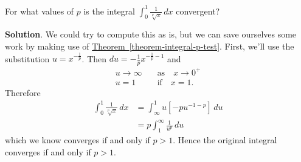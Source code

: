 \documentclass[10pt,]{book}
\theoremstyle{ptxplainnotitle}
\theoremstyle{ptxplaintitle}
\theoremstyle{ptxplainnotitle}
\theoremstyle{ptxplaintitle}
\theoremstyle{ptxplainnotitle}
\theoremstyle{ptxplaintitle}
\theoremstyle{ptxdefinitionnotitle}
\theoremstyle{ptxdefinitiontitle}
\theoremstyle{ptxdefinitionnotitle}
\theoremstyle{ptxdefinitiontitle}
\theoremstyle{ptxdefinitionnotitle}
\theoremstyle{ptxdefinitiontitle}
\theoremstyle{ptxdefinitionnotitle}
\theoremstyle{ptxdefinitiontitle}
\theoremstyle{ptxdefinitionnotitle}
\theoremstyle{ptxdefinitiontitle}
\numberwithin{equation}{section}
\newcommand{\gt}{>}
\begin{document}
\begin{example}\label{example-another-integral-p-test}
\hypertarget{p-600}{}%
For what values of \(p\) is the integral \(\int_{0}^{1}\frac{1}{\sqrt[p]{x}}\,dx\) convergent?%
\par\smallskip%
\noindent\textbf{Solution}.\hypertarget{solution-130}{}\quad%
\hypertarget{p-601}{}%
We could try to compute this as is, but we can save ourselves some work by making use of \hyperref[theorem-integral-p-test]{Theorem~\ref{theorem-integral-p-test}}. First, we'll use the substitution \(u = x^{-\frac{1}{p}}\). Then \(du = -\frac{1}{p}x^{-\frac{1}{p} - 1}\) and%
\begin{align*}
u\to\infty & \quad\text{as}\quad x\to0^{+}\\
u = 1 & \quad\text{if}\quad x = 1.
\end{align*}
Therefore%
\begin{align*}
\int_{0}^{1}\frac{1}{\sqrt[p]{x}}\,dx &= \int_{\infty}^{1}u\left[-pu^{-1 - p}\right]\,du\\
& = p\int_{1}^{\infty}\frac{1}{u^{p}}\,du
\end{align*}
which we know converges if and only if \(p \gt 1\). Hence the original integral converges if and only if \(p\gt1\).%
\end{example}
\typeout{************************************************}
\typeout{************************************************}
\end{document}
